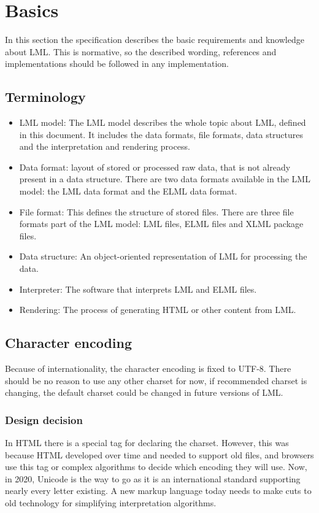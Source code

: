 \documentclass[12pt,a4paper]{article}
\begin{document}
\section{Basics}
In this section the specification describes the basic requirements and knowledge about LML. This is normative, so the described wording, references and implementations should be followed in any implementation.
\subsection{Terminology}
\begin{itemize}
\item LML model: The LML model describes the whole topic about LML, defined in this document. It includes the data formats, file formats, data structures and the interpretation and rendering process.
\item Data format: layout of stored or processed raw data, that is not already present in a data structure. There are two data formats available in the LML model: the LML data format and the ELML data format.
\item File format: This defines the structure of stored files. There are three file formats part of the LML model: LML files, ELML files and XLML package files.
\item Data structure: An object-oriented representation of LML for processing the data.
\item Interpreter: The software that interprets LML and ELML files.
\item Rendering: The process of generating HTML or other content from LML.
\end{itemize}

\subsection{Character encoding}
Because of internationality, the character encoding is fixed to UTF-8. There should be no reason to use any other charset for now, if recommended charset is changing, the default charset could be changed in future versions of LML.

\begin{tcolorbox}
\subsubsection*{Design decision}
In HTML there is a special tag for declaring the charset. However, this was because HTML developed over time and needed to support old files, and browsers use this tag or complex algorithms to decide which encoding they will use. Now, in 2020, Unicode is the way to go as it is an international standard supporting nearly every letter existing. A new markup language today needs to make cuts to old technology for simplifying interpretation algorithms.
\end{tcolorbox}
\end{document}

